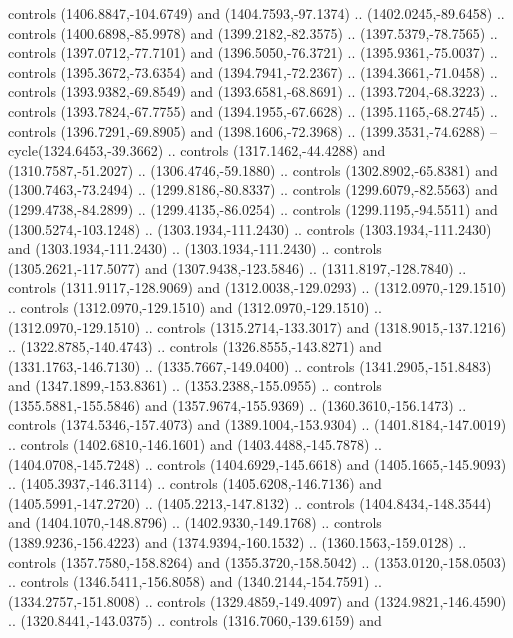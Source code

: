 \begin{scope}[shift={(-22.88722,-49.76189)}]
\begin{scope}[shift={(-739.46591,328.36782)}]
      controls (1406.8847,-104.6749) and (1404.7593,-97.1374) ..
      (1402.0245,-89.6458) .. controls (1400.6898,-85.9978) and (1399.2182,-82.3575)
      .. (1397.5379,-78.7565) .. controls (1397.0712,-77.7101) and
      (1396.5050,-76.3721) .. (1395.9361,-75.0037) .. controls (1395.3672,-73.6354)
      and (1394.7941,-72.2367) .. (1394.3661,-71.0458) .. controls
      (1393.9382,-69.8549) and (1393.6581,-68.8691) .. (1393.7204,-68.3223) ..
      controls (1393.7824,-67.7755) and (1394.1955,-67.6628) .. (1395.1165,-68.2745)
      .. controls (1396.7291,-69.8905) and (1398.1606,-72.3968) ..
      (1399.3531,-74.6288) -- cycle(1324.6453,-39.3662) .. controls
      (1317.1462,-44.4288) and (1310.7587,-51.2027) .. (1306.4746,-59.1880) ..
      controls (1302.8902,-65.8381) and (1300.7463,-73.2494) .. (1299.8186,-80.8337)
      .. controls (1299.6079,-82.5563) and (1299.4738,-84.2899) ..
      (1299.4135,-86.0254) .. controls (1299.1195,-94.5511) and
      (1300.5274,-103.1248) .. (1303.1934,-111.2430) .. controls
      (1303.1934,-111.2430) and (1303.1934,-111.2430) .. (1303.1934,-111.2430) ..
      controls (1305.2621,-117.5077) and (1307.9438,-123.5846) ..
      (1311.8197,-128.7840) .. controls (1311.9117,-128.9069) and
      (1312.0038,-129.0293) .. (1312.0970,-129.1510) .. controls
      (1312.0970,-129.1510) and (1312.0970,-129.1510) .. (1312.0970,-129.1510) ..
      controls (1315.2714,-133.3017) and (1318.9015,-137.1216) ..
      (1322.8785,-140.4743) .. controls (1326.8555,-143.8271) and
      (1331.1763,-146.7130) .. (1335.7667,-149.0400) .. controls
      (1341.2905,-151.8483) and (1347.1899,-153.8361) .. (1353.2388,-155.0955) ..
      controls (1355.5881,-155.5846) and (1357.9674,-155.9369) ..
      (1360.3610,-156.1473) .. controls (1374.5346,-157.4073) and
      (1389.1004,-153.9304) .. (1401.8184,-147.0019) .. controls
      (1402.6810,-146.1601) and (1403.4488,-145.7878) .. (1404.0708,-145.7248) ..
      controls (1404.6929,-145.6618) and (1405.1665,-145.9093) ..
      (1405.3937,-146.3114) .. controls (1405.6208,-146.7136) and
      (1405.5991,-147.2720) .. (1405.2213,-147.8132) .. controls
      (1404.8434,-148.3544) and (1404.1070,-148.8796) .. (1402.9330,-149.1768) ..
      controls (1389.9236,-156.4223) and (1374.9394,-160.1532) ..
      (1360.1563,-159.0128) .. controls (1357.7580,-158.8264) and
      (1355.3720,-158.5042) .. (1353.0120,-158.0503) .. controls
      (1346.5411,-156.8058) and (1340.2144,-154.7591) .. (1334.2757,-151.8008) ..
      controls (1329.4859,-149.4097) and (1324.9821,-146.4590) ..
      (1320.8441,-143.0375) .. controls (1316.7060,-139.6159) and

\end{scope}
\end{scope}
